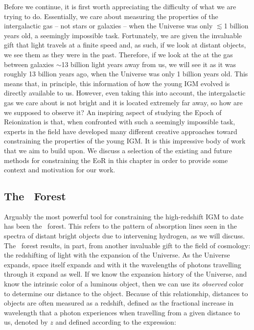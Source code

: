 Before we continue, it is first worth appreciating the difficulty of what we are trying to do. Essentially, we care about measuring the properties of the intergalactic gas -- not stars or galaxies -- when the Universe was only $\lesssim$1 billion years old, a seemingly impossible task. Fortunately, we are given the invaluable gift that light travels at a finite speed and, as such, if we look at distant objects, we see them as they were in the past. Therefore, if we look at the at the gas between galaxies $\sim$13 billion light years away from us, we will see it as it was roughly 13 billion years ago, when the Universe was only 1 billion years old. This means that, in principle, this information of how the young IGM evolved is directly available to us. However, even taking this into account, the intergalactic gas we care about is not bright and it is located extremely far away, so how are we supposed to observe it? An inspiring aspect of studying the Epoch of Reionization is that, when confronted with such a seemingly impossible task, experts in the field have developed many different creative approaches toward constraining the properties of the young IGM. It is this impressive body of work that we aim to build upon. We discuss a selection of the existing and future methods for constraining the EoR in this chapter in order to provide some context and motivation for our work. 

\subsection{The \lya\ Forest}\label{sec:LyaForest}
Arguably the most powerful tool for constraining the high-redshift IGM to date has been the \lya\ forest. This refers to the pattern of absorption lines seen in the spectra of distant bright objects due to intervening hydrogen, as we will discuss. The \lya\ forest results, in part, from another invaluable gift to the field of cosmology: the redshifting of light with the expansion of the Universe. As the Universe expands, space itself expands and with it the wavelengths of photons travelling through it expand as well. If we know the expansion history of the Universe, and know the intrinsic color of a luminous object, then we can use its \textit{observed} color to determine our distance to the object. Because of this relationship, distances to objects are often measured as a redshift, defined as the fractional increase in wavelength that a photon experiences when travelling from a given distance to us, denoted by $z$ and defined according to the expression: 

